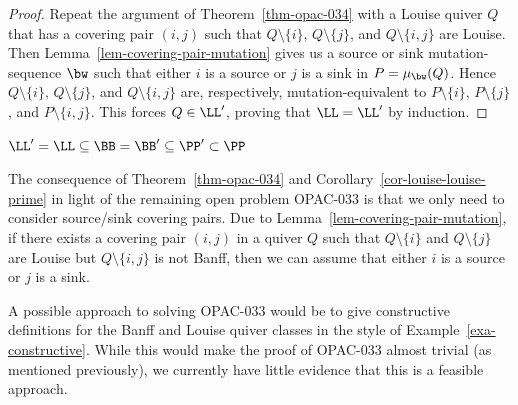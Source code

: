 \begin{proof}
    Repeat the argument of Theorem~\ref{thm-opac-034} with a Louise quiver $Q$ that has a covering pair $(i,j)$ such that $Q \setminus \{i\}$, $Q \setminus \{j\}$, and $Q \setminus \{i,j\}$ are Louise.
    Then Lemma~\ref{lem-covering-pair-mutation} gives us a source or sink mutation-sequence $\bw$ such that either $i$ is a source or $j$ is a sink in $P = \mu_\bw(Q)$.
    Hence $Q \setminus \{i\}$, $Q \setminus \{j\}$, and $Q \setminus \{i,j\}$ are, respectively, mutation-equivalent to $P \setminus \{i\}$, $P \setminus \{j\}$, and $P \setminus \{i,j\}$.
    This forces $Q \in \LL'$, proving that $\LL = \LL'$ by induction.
\end{proof}

\begin{coro} \label{cor-subclasses-all}
    $\LL' = \LL \subseteq \BB = \BB' \subseteq \PP' \subset \PP$
\end{coro}

The consequence of Theorem~\ref{thm-opac-034} and Corollary~\ref{cor-louise-louise-prime} in light of the remaining open problem OPAC-033 is that we only need to consider source/sink covering pairs. 
Due to Lemma~\ref{lem-covering-pair-mutation}, if there exists a covering pair $(i,j)$ in a quiver $Q$ such that $Q \setminus \{i\}$ and $Q \setminus \{j\}$ are Louise but $Q \setminus \{i,j\}$ is not Banff, then we can assume that either $i$ is a source or $j$ is a sink.

A possible approach to solving OPAC-033 would be to give constructive definitions for the Banff and Louise quiver classes in the style of Example~\ref{exa-constructive}. 
While this would make the proof of OPAC-033 almost trivial (as mentioned previously), we currently have little evidence that this is a feasible approach.


